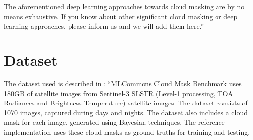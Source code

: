 \documentclass[sigplan,screen]{acmart}
\begin{document}
The aforementioned deep learning approaches towards cloud masking are by no means exhaustive. If you know about other significant cloud masking or deep learning approaches, please inform us and we will add them here.''

\begin{table}[htb]
    \centering
    \caption{This table lists several methods used for cloud masking with their respective dataset, ground truth, and performance \cite{las-2023-cloudmask-related}.}
    \label{tab:datasets}

\end{table}


\section{Dataset} 

The dataset used is described in \cite{las-2023-cloudmask-related}: 
``MLCommons Cloud Mask Benchmark uses 180GB of satellite images from Sentinel-3 SLSTR (Level-1 processing, TOA Radiances and Brightness Temperature) satellite images. The dataset consists of 1070 images, captured during days and nights. The dataset also includes a cloud mask for each image, generated using Bayesian techniques. The reference implementation uses these cloud masks as ground truths for training and testing.
\end{document}
